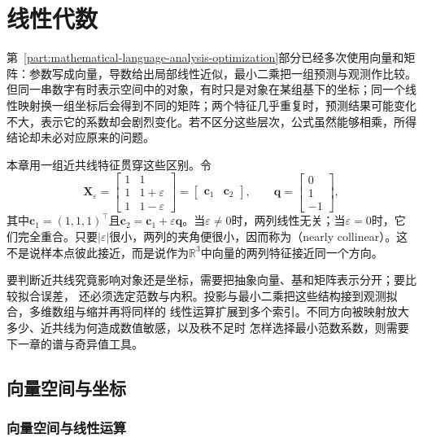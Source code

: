\chapter{线性代数}
\label{chap:linear-algebra}

第~\ref{part:mathematical-language-analysis-optimization}部分已经多次使用向量和矩阵：参数写成向量，导数给出局部线性近似，最小二乘把一组预测与观测作比较。但同一串数字有时表示空间中的对象，有时只是对象在某组基下的坐标；同一个线性映射换一组坐标后会得到不同的矩阵；两个特征几乎重复时，预测结果可能变化不大，表示它的系数却会剧烈变化。若不区分这些层次，公式虽然能够相乘，所得结论却未必对应原来的问题。

本章用一组近共线特征贯穿这些区别。令
\begin{equation}
  \bm{X}_{\varepsilon} = \begin{bmatrix} 1 & 1 \\ 1 & 1+\varepsilon \\ 1 & 1-\varepsilon \end{bmatrix} = \begin{bmatrix} \bm{c}_1 & \bm{c}_2 \end{bmatrix}, \qquad \bm{q} = \begin{bmatrix} 0\\1\\-1 \end{bmatrix}, \label{eq:linear-algebra-nearly-collinear-design}
\end{equation}
其中$\bm{c}_1=(1,1,1)^{\top}$且$\bm{c}_2=\bm{c}_1+\varepsilon\bm{q}$。当$\varepsilon\neq0$时，两列线性无关；当$\varepsilon=0$时，它们完全重合。只要$|\varepsilon|$很小，两列的夹角便很小，因而称为（nearly collinear）。这不是说样本点彼此接近，而是说作为$\mathbb{R}^3$中向量的两列特征接近同一个方向。

要判断近共线究竟影响对象还是坐标，需要把抽象向量、基和矩阵表示分开；要比较拟合误差，
还必须选定范数与内积。投影与最小二乘把这些结构接到观测拟合，多维数组与缩并再将同样的
线性运算扩展到多个索引。不同方向被映射放大多少、近共线为何造成数值敏感，以及秩不足时
怎样选择最小范数系数，则需要下一章的谱与奇异值工具。

\section{向量空间与坐标}
\label{sec:linear-algebra-vector-spaces-coordinates}

\subsection{向量空间与线性运算}

